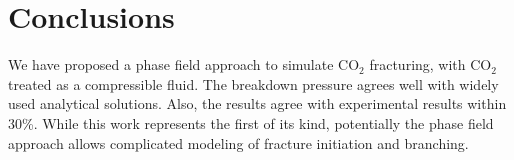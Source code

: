 \section{Conclusions}\label{sec:concl}
We have proposed a phase field approach to simulate CO$_2$ fracturing, with CO$_2$ treated as a compressible fluid. The breakdown pressure agrees well with widely used analytical solutions. Also, the results agree with experimental results within 30\%. While this work represents the first of its kind, potentially the phase field approach allows complicated modeling of fracture initiation and branching.